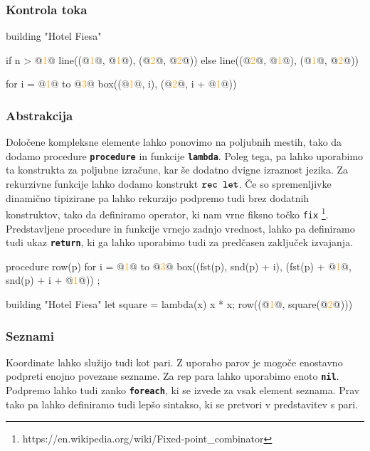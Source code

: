 \documentclass{article}
\newcommand\Num[1]{\textcolor{orange}{#1}}
\newcommand\Keyword[1]{{\textbf{\texttt{#1}}}}
\newcommand\Fun[1]{{\texttt{#1}}}
\begin{document}
\subsubsection{Kontrola toka}

\begin{CITY}
  building "Hotel Fiesa" {
    if n > @\Num{1}@ {
      line((@\Num{1}@, @\Num{1}@), (@\Num{2}@, @\Num{2}@))
    } else {
      line((@\Num{2}@, @\Num{1}@), (@\Num{1}@, @\Num{2}@))
    }

    for i = @\Num{1}@ to @\Num{3}@ {
      box((@\Num{1}@, i), (@\Num{2}@, i + @\Num{1}@))
    }
  }
\end{CITY}

\subsubsection{Abstrakcija}
Določene kompleksne elemente lahko ponovimo na poljubnih mestih, tako da dodamo procedure \Keyword{procedure} in funkcije \Keyword{lambda}.
Poleg tega, pa lahko uporabimo ta konstrukta za poljubne izračune, kar še dodatno dvigne izraznost jezika.
Za rekurzivne funkcije lahko dodamo konstrukt $\Keyword{rec let}$.
Če so spremenljivke dinamično tipizirane pa lahko rekurzijo podpremo tudi brez dodatnih konstruktov, tako da definiramo operator, ki nam vrne fiksno točko \Fun{fix} \footnote{https://en.wikipedia.org/wiki/Fixed-point\_combinator}.
Predstavljene procedure in funkcije vrnejo zadnjo vrednost, lahko pa definiramo tudi ukaz \Keyword{return}, ki ga lahko uporabimo tudi za predčasen zaključek izvajanja.

\begin{CITY}
  procedure row(p) {
    for i = @\Num{1}@ to @\Num{3}@ {
      box((fst(p), snd(p) + i), (fst(p) + @\Num{1}@, snd(p) + i + @\Num{1}@))
    }
  };

  building "Hotel Fiesa" {
    let square = lambda(x) {x * x};
    row((@\Num{1}@, square(@\Num{2}@)))
  }
\end{CITY}

\subsubsection{Seznami}
Koordinate lahko služijo tudi kot pari.
Z uporabo parov je mogoče enostavno podpreti enojno povezane sezname.
Za rep para lahko uporabimo enoto \Keyword{nil}.
Podpremo lahko tudi zanko \Keyword{foreach}, ki se izvede za vsak element seznama.
Prav tako pa lahko definiramo tudi lepšo sintakso, ki se pretvori v predstavitev s pari.
\end{document}
